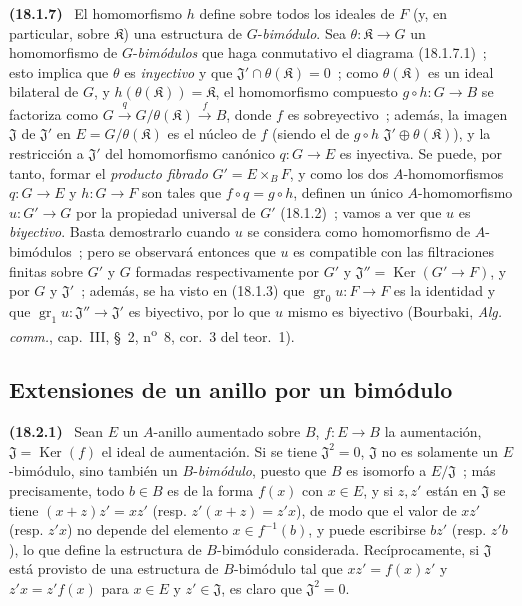\documentclass[10pt,oneside]{book}
\makeatletter
\newcommand{\setmanualcurrentlabel}[1]{\def\@currentlabel{#1}}
\newcommand{\oldpage}[2][]{%
  \setcounter{footnote}{0}%
  \marginpar{\scriptsize\textbf{#1}~|~#2}\ignorespaces}
\newenvironment{env}[1][]{\setmanualcurrentlabel{#1}\par\medskip\noindent\textbf{(#1)}\ }{\par}
\makeatother
\begin{document}
\begin{env}[18.1.7]
\oldpage[0\textsubscript{IV-1}]{54}
El homomorfismo $h$ define sobre todos los ideales de $F$ (y, en particular, sobre
$\mathfrak K$) una estructura de $G$-\emph{bimódulo}. Sea
$\theta:\mathfrak K\to G$ un homomorfismo de $G$-\emph{bimódulos} que haga
conmutativo el diagrama (18.1.7.1)~; esto implica que $\theta$ es
\emph{inyectivo} y que $\mathfrak{J}'\cap\theta(\mathfrak K)=0$~; como
$\theta(\mathfrak K)$ es un ideal bilateral de $G$, y
$h(\theta(\mathfrak K))=\mathfrak K$, el homomorfismo compuesto
$g\circ h:G\to B$ se factoriza como
$G\xrightarrow{q}G/\theta(\mathfrak K)\xrightarrow{f}B$, donde $f$ es
sobreyectivo~; además, la imagen $\mathfrak{J}$ de $\mathfrak{J}'$ en
$E=G/\theta(\mathfrak K)$ es el núcleo de $f$ (siendo el de $g\circ h$
$\mathfrak{J}'\oplus\theta(\mathfrak K)$), y la restricción a
$\mathfrak{J}'$ del homomorfismo canónico $q:G\to E$ es inyectiva. Se
puede, por tanto, formar el \emph{producto fibrado} $G'=E\times_BF$, y como los dos
$A$-homomorfismos $q:G\to E$ y $h:G\to F$ son tales que
$f\circ q=g\circ h$, definen un único $A$-homomorfismo $u:G'\to G$
por la propiedad universal de $G'$ (18.1.2)~; vamos a ver que $u$ es
\emph{biyectivo}. Basta demostrarlo cuando $u$ se considera como
homomorfismo de $A$-bimódulos~; pero se observará entonces que $u$ es compatible
con las filtraciones finitas sobre $G'$ y $G$ formadas respectivamente por $G'$
y $\mathfrak{J}''=\operatorname{Ker}(G'\to F)$, y por $G$ y
$\mathfrak{J}'$~; además, se ha visto en (18.1.3) que
$\operatorname{gr}_0u:F\to F$ es la identidad y que
$\operatorname{gr}_1u:\mathfrak{J}''\to\mathfrak{J}'$ es biyectivo, por lo que $u$
mismo es biyectivo (Bourbaki, \emph{Alg. comm.}, cap.~III, \S~2,
n\textsuperscript{o}~8, cor.~3 del teor.~1).
\end{env}

\subsection{Extensiones de un anillo por un bimódulo}
\label{subsection:0.18.2-es}

\begin{env}[18.2.1]
\label{0.18.2.1-es}
Sean $E$ un $A$-anillo aumentado sobre $B$, $f:E\to B$ la aumentación,
$\mathfrak{J}=\operatorname{Ker}(f)$ el ideal de aumentación. Si se tiene
$\mathfrak{J}^2=0$, $\mathfrak{J}$ no es solamente un $E$-bimódulo, sino
también un $B$-\emph{bimódulo}, puesto que $B$ es isomorfo a
$E/\mathfrak{J}$~; más precisamente, todo $b\in B$ es de la forma $f(x)$
con $x\in E$, y si $z,z'$ están en $\mathfrak{J}$ se tiene
$(x+z)z'=xz'$ (resp. $z'(x+z)=z'x$), de modo que el valor de $xz'$ (resp.
$z'x$) no depende del elemento $x\in f^{-1}(b)$, y puede escribirse $bz'$
(resp. $z'b$), lo que define la estructura de $B$-bimódulo considerada.
Recíprocamente, si $\mathfrak{J}$ está provisto de una estructura de $B$-bimódulo tal
que $xz'=f(x)z'$ y $z'x=z'f(x)$ para $x\in E$ y
$z'\in\mathfrak{J}$, es claro que $\mathfrak{J}^2=0$.
\end{env}
\end{document}
